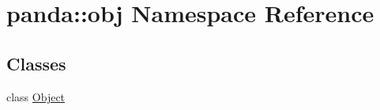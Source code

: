 \hypertarget{namespacepanda_1_1obj}{
\section{panda::obj Namespace Reference}
\label{namespacepanda_1_1obj}
}
\subsection*{Classes}
\begin{DoxyCompactItemize}
\item 
class \hyperlink{classpanda_1_1obj_1_1Object}{Object}
\end{DoxyCompactItemize}

